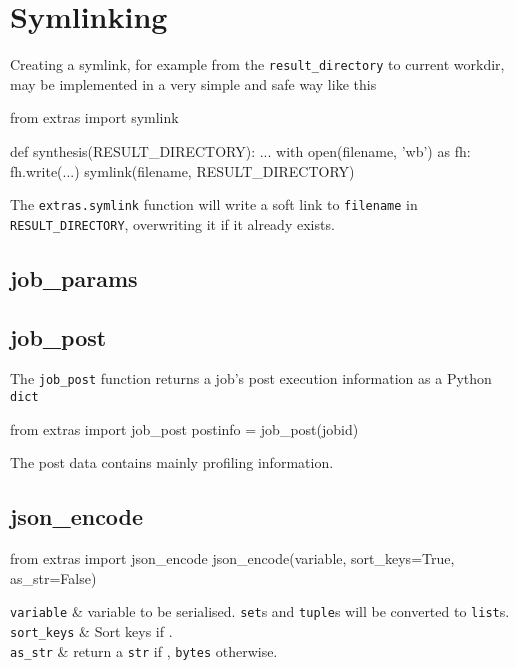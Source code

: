 \section{Symlinking}
Creating a symlink, for example from the \texttt{result\_directory} to
current workdir, may be implemented in a very simple and safe way like
this
\begin{python}
from extras import symlink

def synthesis(RESULT_DIRECTORY):
    ...
    with open(filename, 'wb') as fh:
         fh.write(...)
    symlink(filename, RESULT_DIRECTORY)
\end{python}
The \texttt{extras.symlink} function will write a soft link
to \texttt{filename} in \texttt{RESULT\_DIRECTORY}, overwriting it if
it already exists.

\subsection{job\_params}



\subsection{job\_post}
The \texttt{job\_post} function returns a job's post execution
information as a Python \texttt{dict}
\begin{python}
from extras import job_post
postinfo = job_post(jobid)
\end{python}
The post data contains mainly profiling information.



\subsection{json\_encode}
\begin{python}
from extras import json_encode
json_encode(variable, sort_keys=True, as_str=False)
\end{python}

\starttabletwo
\RPtwo \texttt{variable} & variable to be serialised.  \texttt{set}s and
\texttt{tuple}s will be converted to \texttt{list}s.\\[1ex]

\RPtwo \texttt{sort\_keys} & Sort keys if \pyTrue.\\[1ex]

\RPtwo \texttt{as\_str} & return a \texttt{str} if \pyTrue, \texttt{bytes}
otherwise.
\stoptabletwo




